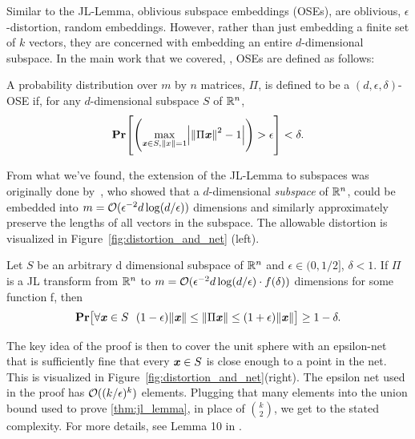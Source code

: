 Similar to the JL-Lemma, 
oblivious subspace embeddings (OSEs), are  oblivious, $\epsilon$-distortion, random embeddings.
However, rather than just embedding a finite set of $k$ vectors,
they are concerned with embedding an entire $d$-dimensional subspace. 
In the main work that we covered, \cite{cohen2016nearly}, OSEs are defined as follows:
%
\begin{definition}
    A probability distribution over $m$ by $n$ matrices, $\Pi$,
    is defined to be a $(d, \epsilon, \delta)$-OSE if,
    for any $d$-dimensional subspace $S$ of $\mathbb R^n$,
    \begin{align}
        \pr \left[ \left( \max_{\xx \in S, \norm{x}=1} \left| \norm{\Pi\xx}^2 - 1\right| \right) > \epsilon \right] < \delta.
    \end{align}
\end{definition}
%
From what we've found, 
the extension of the JL-Lemma to subspaces was originally done by~\cite{sarlos2006improved},
who showed that a $d$-dimensional \textit{subspace} of $\mathbb R^n$,
could be embedded into $m=\mathcal{O}(\epsilon^{-2}d\log(d/\epsilon))$ dimensions
and similarly approximately preserve the lengths of all vectors in the subspace.
The allowable distortion is visualized in Figure~\ref{fig:distortion_and_net} (left).
%
\begin{lemma}
\label{lem:subspace_ext}
Let $S$ be an arbitrary d dimensional subspace of $\mathbb R^n$ and $\epsilon \in (0, 1/2]$, $\delta < 1$. 
If $\Pi$ is a JL transform from $\mathbb R^n$ to 
$m=\mathcal{O}(\epsilon^{-2}d\log(d/\epsilon) \cdot f(\delta))$ dimensions for some 
function f, then
\begin{align*}
    \pr \left[ \forall \xx \in S~~(1-\epsilon) \norm{\xx} \leq \norm{\Pi\xx} \leq (1+\epsilon)\norm{\xx} \right]
            \geq 1-\delta.
\end{align*}
\end{lemma}
%
\begin{proofsketch}
The key idea of the proof is then to cover the unit sphere with an epsilon-net 
that is sufficiently fine that every $\boldsymbol{\mathit{x}} \in S$ is close enough to a point in the net.
This is visualized in Figure~\ref{fig:distortion_and_net}(right).
The epsilon net used in the proof has $\mathcal{O}((k/\epsilon)^k)$ elements.
Plugging that many elements into the union bound used to prove \ref{thm:jl_lemma},
in place of $\binom{k}{2}$, we get to the stated complexity. 
For more details, see Lemma 10 in \cite{sarlos2006improved}.
\end{proofsketch}
%
